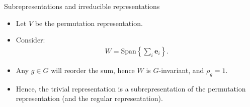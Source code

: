 \documentclass[10pt]{beamer}
\newcommand{\Sym}{\mathcal{S}}
\newcommand{\sgn}{\text{sgn}}
\newcommand{\bas}{\mathbf{e}}
\newcommand{\Span}{\text{Span}}
\begin{document}
	\begin{frame}{Subrepresentations and irreducible representations}
		\begin{example}
			\begin{itemize}
				\item Let $V$ be the permutation representation. 
				
				\item Consider:
				\begin{align*}
					W = \Span\left\lbrace \sum_i \bas_i \right\rbrace.
				\end{align*}\pause
				
				\item Any $g \in G$ will reorder the sum, hence $W$ is $G$-invariant, and $\rho_g = 1$.\pause
				
				\item Hence, the trivial representation is a subrepresentation of the permutation representation (and the regular representation).
			\end{itemize}		
		\end{example}
	\end{frame}
%				
%				
%				
	
\end{document}
